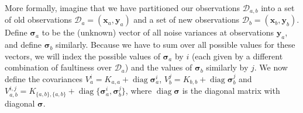 \documentclass[twoside]{article}
\newcommand{\deq}{=}
\newcommand{\cm}[1]{\ensuremath{\mathcal{#1}}}
\newcommand{\bm}[1]{\ensuremath{\mathbf{#1}}}
\newcommand{\data}{\ensuremath{\cm{D}}}
\newcommand{\vect}[1]{\bm{#1}}
\newcommand{\vy}{\vect{y}}
\newcommand{\vx}{\vect{x}}
\newcommand{\vs}{\vect{\sigma}}
\DeclareMathOperator{\diag}{diag}
\begin{document}
More formally, imagine that we have partitioned our observations
$\data_{a,b}$ into a set of old observations
$\data_a\deq(\vx_a,\vy_a)$ and a set of new observations $\data_b
\deq (\vx_b,\vy_b)$. Define $\vs_{a}$ to be the (unknown) vector of
all noise variances at observations $\vy_{a}$, and define $\vs_{b}$
similarly. Because we have to sum over all possible values for these
vectors, we will index the possible values of
$\vs_{a}$ by $i$ (each given by a different combination of
faultiness over $\data_a$) and the values of $\vs_{b}$ similarly by
$j$. We now define the covariances
 $V_a^i  \deq K_{a,a} + \diag \vs_{a}^i$,
 $V_b^j  \deq K_{b,b} + \diag \vs_{b}^j$ and
 $V_{a,b}^{i,j} \deq K_{\{a,b\},\{a,b\}} + \diag \{\vs_{a}^i,\vs_{b}^j\}$,
where $\diag \vs$ is the diagonal matrix with diagonal $\vs$. 
\end{document}

